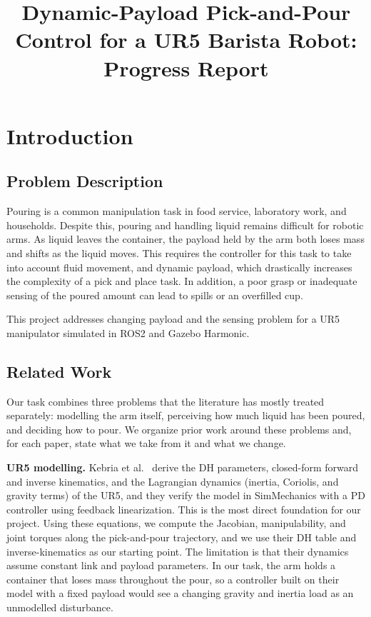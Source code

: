 \documentclass[conference]{IEEEtran}
\begin{document}
\title{Dynamic-Payload Pick-and-Pour Control for a UR5 Barista Robot:\\
    Progress Report}

\author{
    }

\maketitle

\section{Introduction}

\subsection{Problem Description}
Pouring is a common manipulation task in food service, laboratory work, and households. Despite this, 
pouring and handling liquid remains difficult for robotic arms. As liquid leaves the container, the payload 
held by the arm both loses mass and shifts as the liquid moves. This requires the controller for this task to 
take into account fluid movement, and dynamic payload, which drastically increases the complexity of a pick and place task. 
In addition, a poor grasp or inadequate sensing of the poured amount can lead to spills or an overfilled cup.

This project addresses changing payload and the sensing problem for a UR5 manipulator simulated in ROS2 and Gazebo Harmonic.

\subsection{Related Work}

Our task combines three problems that the literature has mostly treated
separately: modelling the arm itself, perceiving how much liquid has been
poured, and deciding how to pour. We organize prior work around these problems
and, for each paper, state what we take from it and what we change.

\textbf{UR5 modelling.}
Kebria et al.\ \cite{kebria2016} derive the DH parameters, closed-form forward and inverse kinematics, 
and the Lagrangian dynamics (inertia, Coriolis, and gravity terms) of the UR5, and they verify the 
model in SimMechanics with a PD controller using feedback linearization. This is the most direct 
foundation for our project. Using these equations, we compute the Jacobian, manipulability, and joint 
torques along the pick-and-pour trajectory, and we use their DH table and inverse-kinematics as our 
starting point. The limitation is that their dynamics assume constant link and payload parameters. 
In our task, the arm holds a container that loses mass throughout the pour, so a controller built on 
their model with a fixed payload would see a changing gravity and inertia load as an unmodelled 
disturbance.
\end{document}
